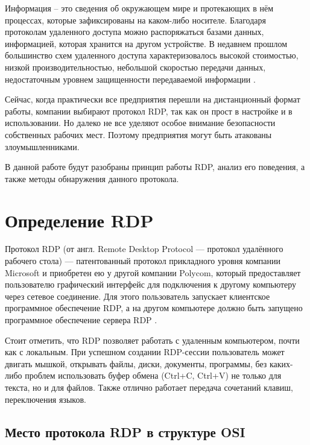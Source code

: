 \documentclass[bachelor, och, coursework]{SCWorks}
\begin{document}


\tableofcontents

\intro
Информация -- это сведения об окружающем мире и протекающих в нём процессах, которые зафиксированы на каком-либо носителе.
Благодаря протоколам удаленного доступа можно распоряжаться базами данных, информацией, которая хранится на другом устройстве. В недавнем 
прошлом большинство схем удаленного доступа характеризовалось высокой стоимостью, низкой производительностью, небольшой скоростью передачи
данных, недостаточным уровнем защищенности передаваемой информации \cite{1}. 

Сейчас, когда практически все предприятия перешли на дистанционный формат работы, компании выбирают протокол RDP, так как он прост в настройке
и в использовании. Но далеко не все уделяют особое внимание безопасности собственных рабочих мест. Поэтому предприятия могут быть атакованы
злоумышленниками.

В данной работе будут разобраны принцип работы RDP, анализ его поведения, а также методы обнаружения данного протокола.

\section{Определение RDP}

  Протокол RDP (от англ. Remote Desktop Protocol --- протокол удалённого рабочего стола) --- патентованный протокол 
  прикладного уровня компании Microsoft и приобретен ею у другой компании Polycom, который предоставляет пользователю графический интерфейс для 
  подключения к другому компьютеру через сетевое соединение. Для этого пользователь запускает клиентское программное обеспечение RDP, а на другом 
  компьютере должно быть запущено программное обеспечение сервера RDP \cite{2}.

  Стоит отметить, что RDP позволяет работать с удаленным компьютером, почти как с локальным. При успешном создании RDP-сессии пользователь может
  двигать мышкой, открывать файлы, диски, документы, программы, без каких-либо проблем использовать буфер обмена (Ctrl+C, Ctrl+V) не только для текста, 
  но и для файлов. Также отлично работает передача сочетаний клавиш, переключения языков.

  \subsection{Место протокола RDP в структуре OSI}
\end{document}
